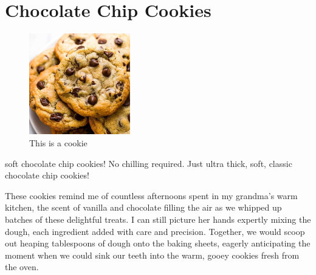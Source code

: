 \chapter{Chocolate Chip Cookies}
\label{ch:extra-choco-chip-cookies}



\begin{figure}
  \includegraphics[width=44mm]{extra/images/BAKERY-STYLE-CHOCOLATE-CHIP-COOKIES-9-637x637-1.jpg}
  \caption{This is a cookie}
  \label{fig:marginfig}
\end{figure}


 soft chocolate chip cookies! No chilling required. Just ultra thick, soft, classic chocolate chip cookies!

These cookies remind me of countless afternoons spent in my grandma's warm kitchen, the scent of vanilla and chocolate filling the air as we whipped up batches of these delightful treats. I can still picture her hands expertly mixing the dough, each ingredient added with care and precision. Together, we would scoop out heaping tablespoons of dough onto the baking sheets, eagerly anticipating the moment when we could sink our teeth into the warm, gooey cookies fresh from the oven.

